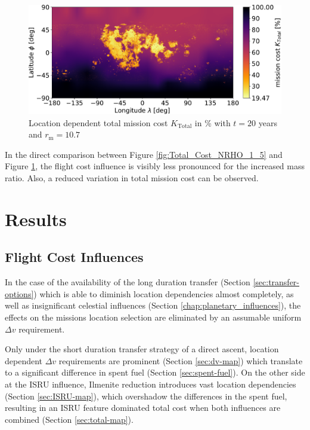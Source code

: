 \documentclass[utf8]{FrontiersinHarvard} %
\begin{document}
\begin{figure}[h!]
\begin{center}
\includegraphics[width=\linewidth]{img/Total_Cost_NRHO_2_0.pdf}
\end{center}
\caption{Location dependent total mission cost $K_{\mathrm{Total}}$ in \% with $t=20$ years and $r_{\mathrm{m}}=10.7$}
\label{fig:Total_Cost_NRHO_2_0}
\end{figure}

In the direct comparison between Figure \ref{fig:Total_Cost_NRHO_1_5} and Figure \ref{fig:Total_Cost_NRHO_2_0}, the flight cost influence is visibly less pronounced for the increased mass ratio. Also, a reduced variation in total mission cost can be observed. 


\newpage
\section{Results}
\label{sec:results}

\subsection{Flight Cost Influences}

In the case of the availability of the long duration transfer (Section \ref{sec:transfer-options}) which is able to diminish location dependencies almost completely, as well as insignificant celestial influences (Section \ref{chap:planetary_influences}), the effects on the missions location selection are eliminated by an assumable uniform $\Delta v$ requirement.

Only under the short duration transfer strategy of a direct ascent, location dependent $\Delta v$ requirements are prominent (Section \ref{sec:dv-map}) which translate to a significant difference in spent fuel (Section \ref{sec:spent-fuel}). On the other side at the ISRU influence, Ilmenite reduction introduces vast location dependencies (Section \ref{sec:ISRU-map}), which overshadow the differences in the spent fuel, resulting in an ISRU feature dominated total cost when both influences are combined (Section \ref{sec:total-map}).
\end{document}
